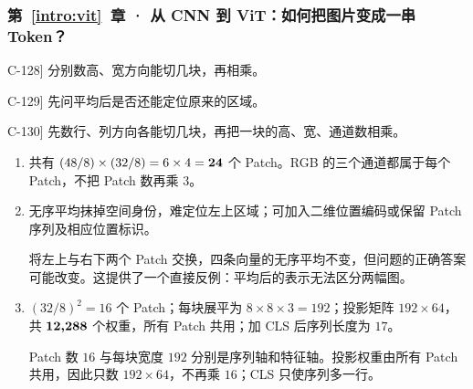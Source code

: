\subsubsection*{第~\ref*{intro:vit}~章 · 从 CNN 到 ViT：如何把图片变成一串 Token？}
\begin{answerhints}
\item[\hyperref[exercise:rectangular-patch-count]{C-128}] \leavevmode{}\label{hint:rectangular-patch-count}分别数高、宽方向能切几块，再相乘。
\item[\hyperref[exercise:vit-spatial-order]{C-129}] \leavevmode{}\label{hint:vit-spatial-order}先问平均后是否还能定位原来的区域。
\item[\hyperref[exercise:patch-projection-count]{C-130}] \leavevmode{}\label{hint:patch-projection-count}先数行、列方向各能切几块，再把一块的高、宽、通道数相乘。
\end{answerhints}
\begin{enumerate}[label={},leftmargin=4.8em,itemsep=4pt]
\item[\textbf{\hyperref[exercise:rectangular-patch-count]{C-128.}}] \leavevmode{}\label{solution:C-128}\label{solution:rectangular-patch-count}共有 $(48/8)\times(32/8)=6\times4=\boldsymbol{24}$ 个 Patch。RGB 的三个通道都属于每个 Patch，不把 Patch 数再乘 $3$。
\item[\textbf{\hyperref[exercise:vit-spatial-order]{C-129.}}] \leavevmode{}\label{solution:C-129}\label{solution:vit-spatial-order}无序平均抹掉空间身份，难定位左上区域；可加入二维位置编码或保留 Patch 序列及相应位置标识。\par 将左上与右下两个 Patch 交换，四条向量的无序平均不变，但问题的正确答案可能改变。这提供了一个直接反例：平均后的表示无法区分两幅图。
\item[\textbf{\hyperref[exercise:patch-projection-count]{C-130.}}] \leavevmode{}\label{solution:C-130}\label{solution:patch-projection-count}$(32/8)^2=16$ 个 Patch；每块展平为 $8\times8\times3=192$；投影矩阵 $192\times64$，共 $\boldsymbol{12{,}288}$ 个权重，所有 Patch 共用；加 CLS 后序列长度为 $17$。\par Patch 数 $16$ 与每块宽度 $192$ 分别是序列轴和特征轴。投影权重由所有 Patch 共用，因此只数 $192\times64$，不再乘 $16$；CLS 只使序列多一行。
\end{enumerate}
